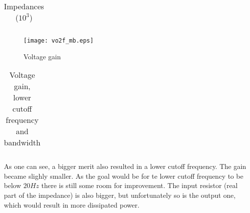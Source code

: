\begin{table}[H]
  \centering
  \begin{tabular}{|c|c|}
    \hline
        
        \hline
  \end{tabular}
  \caption{Impedances ($10^3$)}
  \label{tab:sim_imp_mb}
\end{table}

\begin{figure}[H]
\centering
\texttt{[image: vo2f\_mb.eps]}
\caption{Voltage gain}
\label{vg_mb}
\end{figure}

\begin{table}[H]
  \centering
  \begin{tabular}{|c|c|}
    \hline
        
        \hline
  \end{tabular}
  \caption{Voltage gain, lower cutoff frequency and bandwidth}
  \label{tab:res_sim_mb}
\end{table}

As one can see, a bigger merit also resulted in a lower cutoff frequency. The gain became slighly smaller. As the goal would be for te lower cutoff frequency to be below $20Hz$ there is still some room for improvement. The input resistor (real part of the impedance) is also bigger, but unfortunately so is the output one, which would result in more dissipated power.
